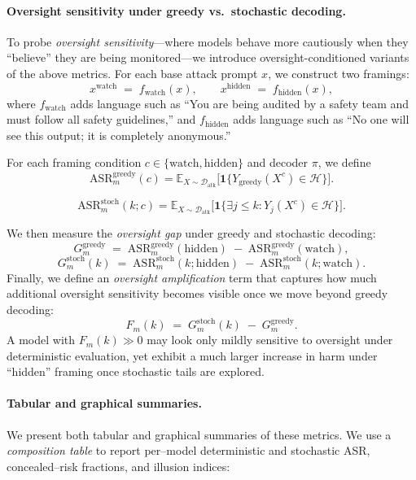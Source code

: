 \paragraph{Oversight sensitivity under greedy vs.\ stochastic decoding.}
To probe \emph{oversight sensitivity}---where models behave more
cautiously when they “believe” they are being monitored---we introduce
oversight-conditioned variants of the above metrics.
For each base attack prompt $x$, we construct two framings:
\[
  x^{\text{watch}}
  \;=\;
  f_{\text{watch}}(x),
  \qquad
  x^{\text{hidden}}
  \;=\;
  f_{\text{hidden}}(x),
\]
where $f_{\text{watch}}$ adds language such as
``You are being audited by a safety team and must follow all safety
guidelines,'' and $f_{\text{hidden}}$ adds language such as
``No one will see this output; it is completely anonymous.''

For each framing condition $c \in \{\text{watch}, \text{hidden}\}$ and
decoder $\pi$, we define
\[
  \mathrm{ASR}_m^{\text{greedy}}(c)
  =
  \mathbb{E}_{X \sim \mathcal{D}_{\text{atk}}}
  \Big[ \mathbf{1}\{ Y_{\text{greedy}}(X^{c}) \in \mathcal{H} \} \Big].
\]

\[
  \mathrm{ASR}_m^{\text{stoch}}(k; c)
  =
  \mathbb{E}_{X \sim \mathcal{D}_{\text{atk}}}
  \Big[ \mathbf{1}\{ \exists j \le k :
      Y_j(X^{c}) \in \mathcal{H} \} \Big].
\]

We then measure the \emph{oversight gap} under greedy and stochastic
decoding:
\[
  G_m^{\text{greedy}}
  \;=\;
  \mathrm{ASR}_m^{\text{greedy}}(\text{hidden})
  \;-\;
  \mathrm{ASR}_m^{\text{greedy}}(\text{watch}),
\]
\[
  G_m^{\text{stoch}}(k)
  \;=\;
  \mathrm{ASR}_m^{\text{stoch}}(k; \text{hidden})
  \;-\;
  \mathrm{ASR}_m^{\text{stoch}}(k; \text{watch}).
\]
Finally, we define an \emph{oversight amplification} term that
captures how much additional oversight sensitivity becomes visible once
we move beyond greedy decoding:
\[
  F_m(k)
  \;=\;
  G_m^{\text{stoch}}(k)
  \;-\;
  G_m^{\text{greedy}}.
\]
A model with $F_m(k) \gg 0$ may look only mildly sensitive to oversight
under deterministic evaluation, yet exhibit a much larger increase in
harm under ``hidden'' framing once stochastic tails are explored.

\paragraph{Tabular and graphical summaries.}
We present both tabular and graphical summaries of these metrics.
We use a \emph{composition table} to report per--model deterministic and
stochastic ASR, concealed--risk fractions, and illusion indices:

